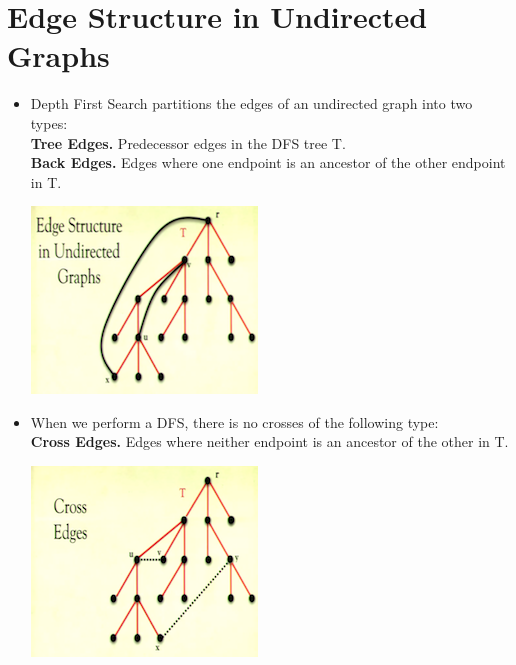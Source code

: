 \documentclass[12pt]{article}
\begin{document}
\section{Edge Structure in Undirected Graphs}
\renewcommand{\labelitemii}{$\circ$}
\renewcommand{\labelitemiii}{$\cdot$}
\renewcommand{\labelitemiii}{$\rightarrow$}
\renewcommand{\labelitemiv}{$\star$}
\begin{itemize}
\item Depth First Search partitions the edges of an undirected graph into two types:\\
\textbf{Tree Edges.} Predecessor edges in the DFS tree T.\\
\textbf{Back Edges.} Edges where one endpoint is an ancestor of the other endpoint in T.
\begin{center}
\includegraphics{lecture92}
\end{center}
\item When we perform a DFS, there is no crosses of the following type:\\
\textbf{Cross Edges.} Edges where neither endpoint is an ancestor of the other in T.
\begin{center}
\includegraphics{lecture93}
\end{center}
\end{itemize}
\end{document}
